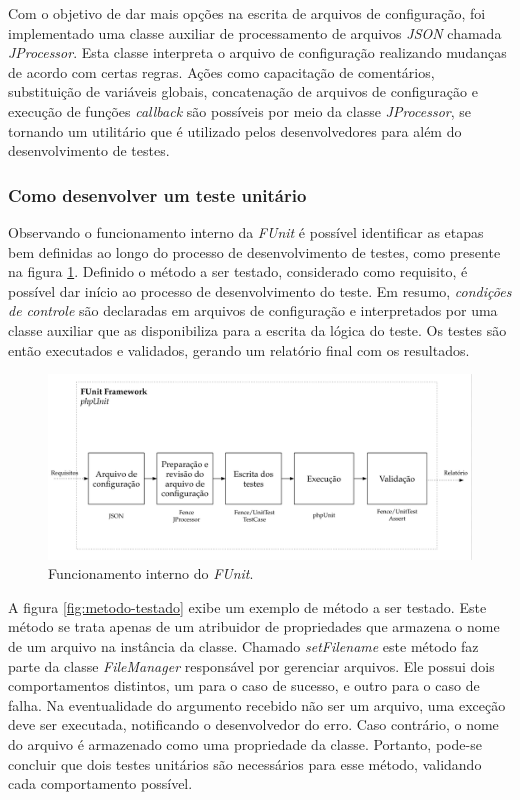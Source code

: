 Com o objetivo de dar mais opções na escrita de arquivos de configuração, foi implementado uma classe auxiliar de processamento de arquivos \emph{JSON} chamada \emph{JProcessor}. Esta classe interpreta o arquivo de configuração realizando mudanças de acordo com certas regras. Ações como capacitação de comentários, substituição de variáveis globais, concatenação de arquivos de configuração e execução de funções \emph{callback} são possíveis por meio da classe \emph{JProcessor}, se tornando um utilitário que é utilizado pelos desenvolvedores para além do desenvolvimento de testes.

\hypertarget{como-desenvolver-um-teste-unitario}{%
\subsubsection{Como desenvolver um teste unitário}\label{como-desenvolver-um-teste-unitario}}

Observando o funcionamento interno da \emph{FUnit} é possível identificar as etapas bem definidas ao longo do processo de desenvolvimento de testes, como presente na figura \ref{fig:funit-phpunit}. Definido o método a ser testado, considerado como requisito, é possível dar início ao processo de desenvolvimento do teste. Em resumo, \emph{condições de controle} são declaradas em arquivos de configuração e interpretados por uma classe auxiliar que as disponibiliza para a escrita da lógica do teste. Os testes são então executados e validados, gerando um relatório final com os resultados.

\begin{figure}[H]
    \centering
    \includegraphics[width=14cm]{source/4-solucao/images/funit-phpunit.png}
    \caption{Funcionamento interno do \emph{FUnit}.}
    \label{fig:funit-phpunit}
\end{figure}

A figura \ref{fig:metodo-testado} exibe um exemplo de método a ser testado. Este método se trata apenas de um atribuidor de propriedades que armazena o nome de um arquivo na instância da classe. Chamado \emph{setFilename} este método faz parte da classe \emph{FileManager} responsável por gerenciar arquivos. Ele possui dois comportamentos distintos, um para o caso de sucesso, e outro para o caso de falha. Na eventualidade do argumento recebido não ser um arquivo, uma exceção deve ser executada, notificando o desenvolvedor do erro. Caso contrário, o nome do arquivo é armazenado como uma propriedade da classe. Portanto, pode-se concluir que dois testes unitários são necessários para esse método, validando cada comportamento possível.

